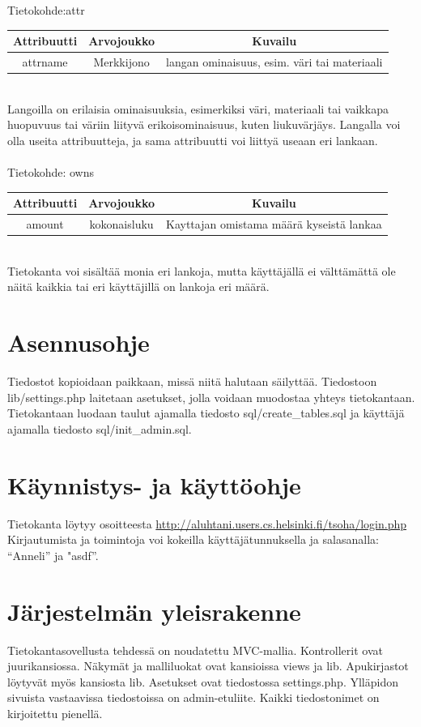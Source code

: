 \documentclass[12pt]{article}
\begin{document}
\ \\ \ \\
Tietokohde:attr\\
\begin{tabular}{|c|c|c|}
\hline
Attribuutti & Arvojoukko & Kuvailu \\
\hline
attrname & Merkkijono & langan ominaisuus, esim. väri tai materiaali\\
\hline   
\end{tabular}
\\
Langoilla on erilaisia ominaisuuksia, esimerkiksi väri, materiaali tai vaikkapa huopuvuus tai väriin liityvä erikoisominaisuus, kuten liukuvärjäys. Langalla voi olla useita attribuutteja, ja sama attribuutti voi liittyä useaan eri lankaan. 
\ \\ \ \\
Tietokohde: owns\\
\begin{tabular}{|c|c|c|}
\hline
Attribuutti & Arvojoukko & Kuvailu \\
\hline
amount & kokonaisluku & Kayttajan omistama määrä kyseistä lankaa\\
\hline  
\end{tabular}
\\
Tietokanta voi sisältää monia eri lankoja, mutta käyttäjällä ei välttämättä ole näitä kaikkia tai eri käyttäjillä on lankoja eri määrä. 
\section{Asennusohje}
Tiedostot kopioidaan paikkaan, missä niitä halutaan säilyttää. Tiedostoon lib/settings.php laitetaan asetukset, jolla voidaan muodostaa yhteys tietokantaan. Tietokantaan luodaan taulut ajamalla tiedosto sql/create\_tables.sql ja käyttäjä ajamalla tiedosto sql/init\_admin.sql. 
\section{Käynnistys- ja käyttöohje}
Tietokanta löytyy osoitteesta \href{http://aluhtani.users.cs.helsinki.fi/tsoha/login.php}{http://aluhtani.users.cs.helsinki.fi/tsoha/login.php}
\\
Kirjautumista ja toimintoja voi kokeilla käyttäjätunnuksella ja salasanalla: ``Anneli'' ja "asdf''.
\section{Järjestelmän yleisrakenne}
Tietokantasovellusta tehdessä on noudatettu MVC-mallia. Kontrollerit ovat juurikansiossa. Näkymät ja malliluokat ovat kansioissa views ja lib. Apukirjastot löytyvät myös kansiosta lib. Asetukset ovat tiedostossa settings.php. Ylläpidon sivuista vastaavissa tiedostoissa on admin-etuliite. Kaikki tiedostonimet on kirjoitettu pienellä. 
\end{document}
